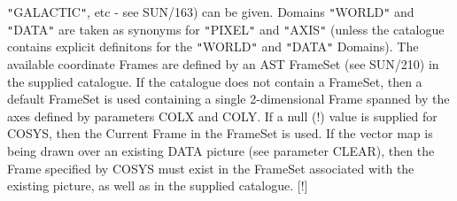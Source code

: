 {{{         {\tt "}GALACTIC{\tt "}, etc - see SUN/163) can be given. Domains {\tt "}WORLD{\tt "} and
         {\tt "}DATA{\tt "} are taken as synonyms for {\tt "}PIXEL{\tt "} and {\tt "}AXIS{\tt "} (unless the
         catalogue contains explicit definitons for the {\tt "}WORLD{\tt "} and {\tt "}DATA{\tt "}
         Domains). The available coordinate Frames are defined by an AST
         FrameSet (see SUN/210) in the supplied catalogue. If the catalogue
         does not contain a FrameSet, then a default FrameSet is used
         containing a single 2-dimensional Frame spanned by the axes defined
         by parameters COLX and COLY. If a null (!) value is supplied for
         COSYS, then the Current Frame in the FrameSet is used. If the vector
         map is being drawn over an existing DATA picture (see parameter
         CLEAR), then the Frame specified by COSYS must exist in the FrameSet
         associated with the existing picture, as well as in the supplied
         catalogue. [!]
      }
      }}
